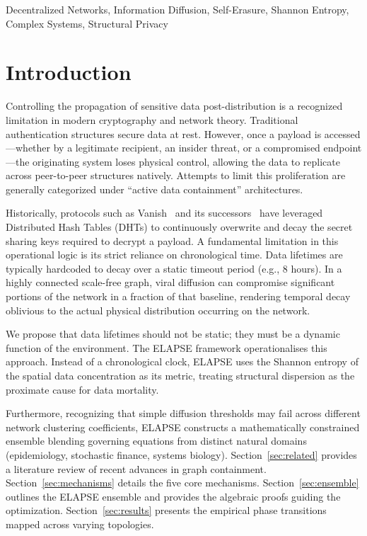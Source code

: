 \documentclass[conference]{IEEEtran}
\begin{document}
\begin{IEEEkeywords}
Decentralized Networks, Information Diffusion, Self-Erasure, Shannon Entropy,
Complex Systems, Structural Privacy
\end{IEEEkeywords}

\section{Introduction}

Controlling the propagation of sensitive data post-distribution is a recognized
limitation in modern cryptography and network theory. Traditional authentication
structures secure data at rest. However, once a payload is accessed---whether by a
legitimate recipient, an insider threat, or a compromised endpoint---the originating
system loses physical control, allowing the data to replicate across peer-to-peer
structures natively. Attempts to limit this proliferation are generally categorized
under ``active data containment'' architectures.

Historically, protocols such as Vanish~\cite{geambasu2009vanish} and its
successors~\cite{tang2010fade} have leveraged Distributed Hash Tables (DHTs) to
continuously overwrite and decay the secret sharing keys required to decrypt a
payload. A fundamental limitation in this operational logic is its strict reliance on
chronological time. Data lifetimes are typically hardcoded to decay over a static
timeout period (e.g., 8 hours). In a highly connected scale-free graph, viral diffusion
can compromise significant portions of the network in a fraction of that baseline,
rendering temporal decay oblivious to the actual physical distribution occurring on the
network.

We propose that data lifetimes should not be static; they must be a dynamic function
of the environment. The ELAPSE framework operationalises this approach. Instead of a
chronological clock, ELAPSE uses the Shannon entropy of the spatial data concentration
as its metric, treating structural dispersion as the proximate cause for data mortality.

Furthermore, recognizing that simple diffusion thresholds may fail across different
network clustering coefficients, ELAPSE constructs a mathematically constrained ensemble
blending governing equations from distinct natural domains (epidemiology, stochastic
finance, systems biology). Section~\ref{sec:related} provides a literature review of
recent advances in graph containment. Section~\ref{sec:mechanisms} details the five
core mechanisms. Section~\ref{sec:ensemble} outlines the ELAPSE ensemble and provides
the algebraic proofs guiding the optimization. Section~\ref{sec:results} presents the
empirical phase transitions mapped across varying topologies.
\end{document}
